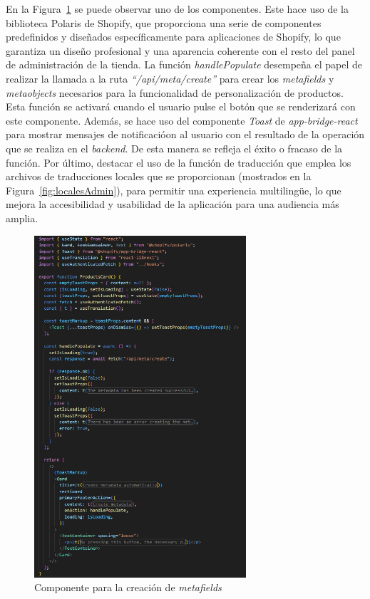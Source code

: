 \documentclass[11pt]{article}
\begin{document}
En la Figura~\ref{fig:componenteMetafield} se puede observar uno de los componentes. Este hace uso de la biblioteca Polaris de Shopify, que proporciona una serie de componentes predefinidos
y diseñados específicamente para aplicaciones de Shopify, lo que garantiza un diseño profesional y una aparencia coherente con el resto del panel de administración de la tienda.
La función \textit{handlePopulate} desempeña el papel de realizar la llamada a la ruta \textit{``/api/meta/create''} para crear los \textit{metafields} y \textit{metaobjects} necesarios para la funcionalidad de personalización de productos.
Esta función se activará cuando el usuario pulse el botón que se renderizará con este componente. Además, se hace uso del componente \textit{Toast} de \textit{app-bridge-react} para mostrar
mensajes de notificacióon al usuario con el resultado de la operación que se realiza en el \textit{backend}. De esta manera se refleja el éxito o fracaso de la función. Por último, destacar el uso de la función
de traducción que emplea los archivos de traducciones locales que se proporcionan (mostrados en la Figura~\ref{fig:localesAdmin}), para permitir una experiencia multilingüe, lo que mejora
la accesibilidad y usabilidad de la aplicación para una audiencia más amplia.


\begin{figure}[H]
    \centering
    \includegraphics[width=0.7\textwidth]{imagenes-admin/metafieldComponent.png}
    \caption{\label{fig:componenteMetafield} Componente para la creación de \textit{metafields} }
    \vspace{\fill}
\end{figure}
\end{document}
